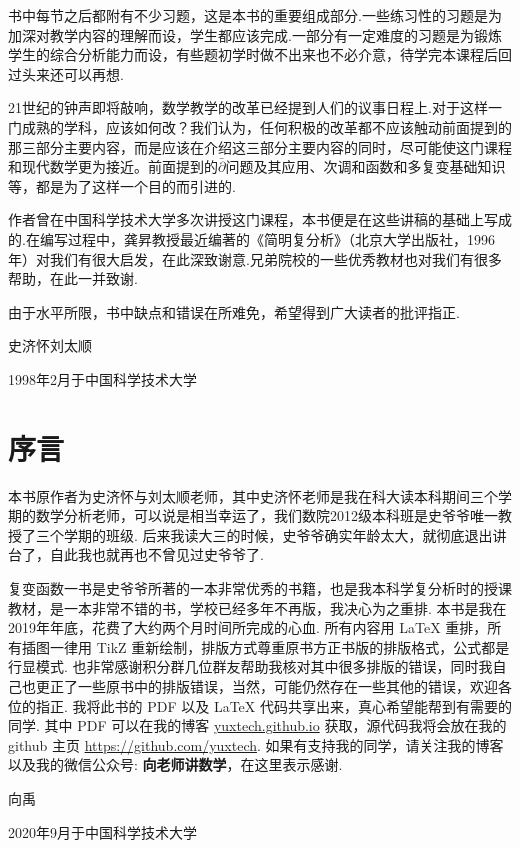 书中每节之后都附有不少习题，这是本书的重要组成部分.一些练习性的习题是为加深对教学内容的理解而设，学生都应该完成.一部分有一定难度的习题是为锻炼学生的综合分析能力而设，有些题初学时做不出来也不必介意，待学完本课程后回过头来还可以再想.

21世纪的钟声即将敲响，数学教学的改革已经提到人们的议事日程上.对于这样一门成熟的学科，应该如何改？我们认为，任何积极的改革都不应该触动前面提到的那三部分主要内容，而是应该在介绍这三部分主要内容的同时，尽可能使这门课程和现代数学更为接近。前面提到的$\bar\partial$问题及其应用、次调和函数和多复变基础知识等，都是为了这样一个目的而引进的.

作者曾在中国科学技术大学多次讲授这门课程，本书便是在这些讲稿的基础上写成的.在编写过程中，龚昇教授最近编著的《简明复分析》（北京大学出版社，1996年）对我们有很大启发，在此深致谢意.兄弟院校的一些优秀教材也对我们有很多帮助，在此一并致谢.

由于水平所限，书中缺点和错误在所难免，希望得到广大读者的批评指正.

\vspace*{1cm}
\hfill {\kaishu 史济怀\qquad 刘太顺}\hspace*{1.2cm}

\hfill 1998年2月于中国科学技术大学

\newpage
\chapter*{序\qquad 言}
本书原作者为史济怀与刘太顺老师，其中史济怀老师是我在科大读本科期间三个学期的数学分析老师，可以说是相当幸运了，我们数院2012级本科班是史爷爷唯一教授了三个学期的班级. 后来我读大三的时候，史爷爷确实年龄太大，就彻底退出讲台了，自此我也就再也不曾见过史爷爷了.

复变函数一书是史爷爷所著的一本非常优秀的书籍，也是我本科学复分析时的授课教材，是一本非常不错的书，学校已经多年不再版，我决心为之重排. 本书是我在2019年年底，花费了大约两个月时间所完成的心血. 所有内容用 \LaTeX{} 重排，所有插图一律用 TikZ 重新绘制，排版方式尊重原书方正书版的排版格式，公式都是行显模式. 也非常感谢积分群几位群友帮助我核对其中很多排版的错误，同时我自己也更正了一些原书中的排版错误，当然，可能仍然存在一些其他的错误，欢迎各位的指正. 我将此书的 PDF 以及 \LaTeX{} 代码共享出来，真心希望能帮到有需要的同学. 其中 PDF 可以在我的博客 \href{yuxtech.github.io}{yuxtech.github.io} 获取，源代码我将会放在我的 github 主页 \href{https://github.com/yuxtech}{https://github.com/yuxtech}. 如果有支持我的同学，请关注我的博客以及我的微信公众号: \textbf{向老师讲数学}，在这里表示感谢.

\hfill {\kaishu 向禹}\hspace*{2.8cm}

\hfill 2020年9月于中国科学技术大学
\clearpage
